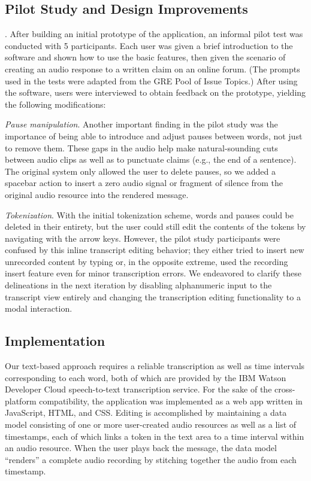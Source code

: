 \subsection{Pilot Study and Design Improvements}
.
After building an initial prototype of the application, an informal pilot test was conducted with 5 participants. 
Each user was given a brief introduction to the software and shown how to use the basic features, then given the scenario of creating an audio response to a written claim on an online forum. 
(The prompts used in the tests were adapted from the GRE Pool of Issue Topics.) 
After using the software, users were interviewed to obtain feedback on the prototype, yielding the following modifications:

\emph{Pause manipulation}.
Another important finding in the pilot study was the importance of being able to introduce and adjust pauses between words, not just to remove them. 
These gaps in the audio help make natural-sounding cuts between audio clips as well as to punctuate claims (e.g., the end of a sentence). 
The original system only allowed the user to delete pauses, so we added a spacebar action to insert a zero audio signal or fragment of silence from the original audio resource into the rendered message. 

\emph{Tokenization}. 
With the initial tokenization scheme, words and pauses could be deleted in their entirety, but the user could still edit the contents of the tokens by navigating with the arrow keys.
However, the pilot study participants were confused by this inline transcript editing behavior; they either tried to insert new unrecorded content by typing or, in the opposite extreme, used the recording insert feature even for minor transcription errors. 
We endeavored to clarify these delineations in the next iteration by disabling alphanumeric input to the transcript view entirely and changing the transcription editing functionality to a modal interaction. \cite{this paragraph is hard to get. Please clarify.}

\subsection{Implementation}
Our text-based approach requires a reliable transcription as well as time intervals corresponding to each word, both of which are provided by the IBM Watson Developer Cloud speech-to-text transcription service. \cite{Aren't there any data from IBM about the benchmarked WER ?}
For the sake of the cross-platform compatibility, the application was implemented as a web app written in JavaScript, HTML, and CSS.
Editing is accomplished by maintaining a data model consisting of one or more user-created audio resources as well as a list of timestamps, each of which links a token in the text area to a time interval within an audio resource. 
When the user plays back the message, the data model ``renders'' a complete audio recording by stitching together the audio from each timestamp. 
